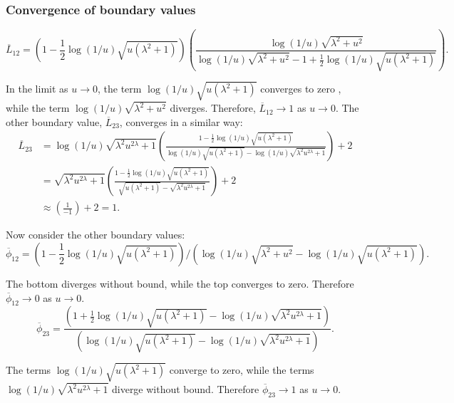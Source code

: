 \subsubsection{Convergence of boundary values}

\begin{equation}
 \overline L_{12} = \left (1 - \frac{1}{2} \log(1/u) \sqrt{u (\lambda^2 + 1)} \right ) \left ( \frac{\log(1/u) \sqrt{\lambda^2 + u^2}}{\log(1/u) \sqrt{\lambda^2 + u^2} - 1 + \frac{1}{2} \log(1/u) \sqrt{u (\lambda^2 + 1) }} \right ).
\end{equation}

In the limit as $u \rightarrow 0$, the term $ \log(1/u) \sqrt{u (\lambda^2 + 1)}$ converges to zero , while the term $\log(1/u) \sqrt{\lambda^2 + u^2}$ diverges.  Therefore, $\overline L_{12} \rightarrow 1$ as $u \rightarrow 0$.  The other boundary value, $\overline L_{23}$, converges in a similar way:
\begin{equation}
\begin{split}
 \overline L_{23} &=\log(1/u) \sqrt{\lambda^2 u^{2\lambda} + 1} \left ( \frac{1-\frac{1}{2}\log(1/u) \sqrt{u(\lambda^2 + 1)}}{\log(1/u) \sqrt{u(\lambda^2 + 1)} - \log(1/u) \sqrt{\lambda^2 u^{2 \lambda} + 1 }} \right )+2\\
 &= \sqrt{\lambda^2 u^{2\lambda} + 1} \left ( \frac{1-\frac{1}{2}\log(1/u) \sqrt{u(\lambda^2 + 1)}}{ \sqrt{u(\lambda^2 + 1)} -  \sqrt{\lambda^2 u^{2 \lambda} + 1 }} \right )+2\\
 &\approx  \left ( \frac{1}{ -1 } \right )+2=1.
\end{split}
\end{equation}

Now consider the other boundary values:
\begin{equation}
 \overline\phi_{12} = \left(1-\frac{1}{2}\log(1/u)\sqrt{u(\lambda^2+1)} \right )/ \left (\log(1/u)\sqrt{\lambda^2+u^2}-\log(1/u) \sqrt{u(\lambda^2+1)} \right ).
\end{equation}

The bottom diverges without bound, while the top converges to zero.  Therefore $\overline\phi_{12} \rightarrow 0$ as $u \rightarrow 0$.
\begin{equation}
 \overline\phi_{23} = \frac{\left (1+\frac{1}{2} \log(1/u) \sqrt{u(\lambda^2+1)} - \log(1/u) \sqrt{\lambda^2 u^{2 \lambda} + 1} \right)}{\left ( \log(1/u) \sqrt{u(\lambda^2+1)} - \log(1/u)\sqrt{\lambda^2 u^{2\lambda} + 1}\right)}.
\end{equation}

The terms $\log(1/u) \sqrt{u(\lambda^2+1)}$ converge to zero, while the terms $\log(1/u)\sqrt{\lambda^2 u^{2\lambda} + 1}$ diverge without bound.  Therefore $\overline\phi_{23} \rightarrow 1$ as $u \rightarrow 0$.



